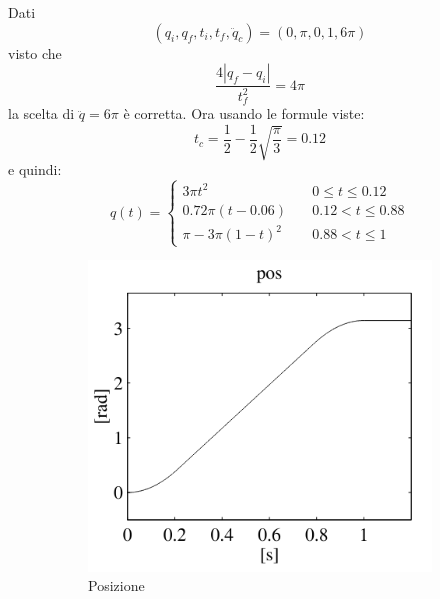 \begin{example}
Dati
$$
(q_i, q_f, t_i, t_f, \ddot{q}_c)
=
(0,\pi,0,1,6\pi)
$$
visto che
$$
\frac{4|q_f - q_i|}{t_f^2} = 4\pi
$$
la scelta di $\ddot{q} = 6\pi$ è corretta. Ora usando le formule viste:
$$
t_c = \frac{1}{2} - \frac{1}{2}\sqrt{\frac{\pi}{3}} = 0.12
$$
e quindi:
$$
q(t)
=
\begin{cases}
	3\pi t^2 & \quad 0 \leq t \leq 0.12 \\
	0.72\pi (t - 0.06) & \quad 0.12 < t \leq 0.88 \\
	\pi - 3\pi (1 - t)^2 & \quad 0.88 < t \leq 1
\end{cases}
$$



\vspace*{10pt}
\begin{figure}[H]
	\begin{subfigure}{0.3\linewidth}
		\centering
		\includegraphics[width=\linewidth]{images/trajectories_12}
		\caption{Posizione}
		\label{fig:trajectories12}
	\end{subfigure}
	\hfill
	\begin{subfigure}{0.3\linewidth}
		\centering

\end{subfigure}
\end{figure}
\end{example}
